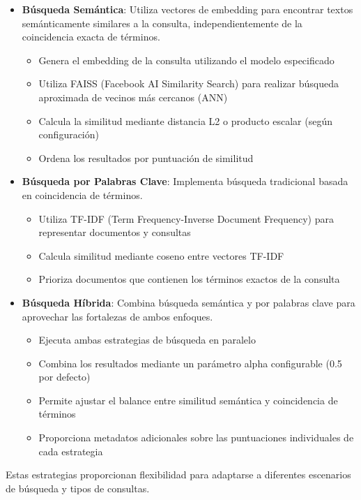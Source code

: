 \documentclass[12pt,a4paper]{article}
\begin{document}
\begin{itemize}
    \item \textbf{Búsqueda Semántica}: Utiliza vectores de embedding para encontrar textos semánticamente similares a la consulta, independientemente de la coincidencia exacta de términos.
    \begin{itemize}
        \item Genera el embedding de la consulta utilizando el modelo especificado
        \item Utiliza FAISS (Facebook AI Similarity Search) para realizar búsqueda aproximada de vecinos más cercanos (ANN)
        \item Calcula la similitud mediante distancia L2 o producto escalar (según configuración)
        \item Ordena los resultados por puntuación de similitud
    \end{itemize}
    
    \item \textbf{Búsqueda por Palabras Clave}: Implementa búsqueda tradicional basada en coincidencia de términos.
    \begin{itemize}
        \item Utiliza TF-IDF (Term Frequency-Inverse Document Frequency) para representar documentos y consultas
        \item Calcula similitud mediante coseno entre vectores TF-IDF
        \item Prioriza documentos que contienen los términos exactos de la consulta
    \end{itemize}
    
    \item \textbf{Búsqueda Híbrida}: Combina búsqueda semántica y por palabras clave para aprovechar las fortalezas de ambos enfoques.
    \begin{itemize}
        \item Ejecuta ambas estrategias de búsqueda en paralelo
        \item Combina los resultados mediante un parámetro alpha configurable (0.5 por defecto)
        \item Permite ajustar el balance entre similitud semántica y coincidencia de términos
        \item Proporciona metadatos adicionales sobre las puntuaciones individuales de cada estrategia
    \end{itemize}
\end{itemize}

Estas estrategias proporcionan flexibilidad para adaptarse a diferentes escenarios de búsqueda y tipos de consultas.
\end{document}
